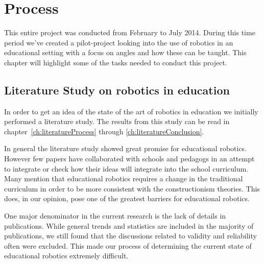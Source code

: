 \chapter{Process}
This entire project was conducted from February to July 2014. During this time period we've created a pilot-project looking into the use of robotics in an educational setting with a focus on angles and how these can be taught.
This chapter will highlight some of the tasks needed to conduct this project. 

\section{Literature Study on robotics in education}
In order to get an idea of the state of the art of robotics in education we initially performed a literature study. The results from this study can be read in chapter~\ref{ch:literatureProcess} through \ref{ch:literatureConclusion}.

\bigskip\noindent
In general the literature study showed great promise for educational robotics. However few papers have collaborated with schools and pedagogs in an attempt to integrate or check how their ideas will integrate into the school curriculum. Many mention that educational robotics requires a change in the traditional curriculum in order to be more consistent with the constructionism theories. This does, in our opinion, pose one of the greatest barriers for educational robotics.

\bigskip\noindent
One major denominator in the current research is the lack of details in publications. While general trends and statistics are included in the majority of publications, we still found that the discussions related to validity and reliability often were excluded. This made our process of determining the current state of educational robotics extremely difficult. 


